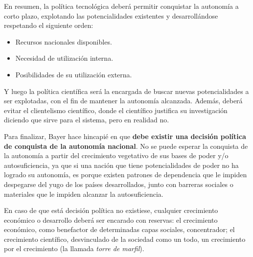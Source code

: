 En resumen, la política tecnológica deberá permitir conquistar la autonomía a corto
plazo, explotando las potencialidades existentes y desarrollándose respetando el siguiente orden:
\begin{itemize}
    \item Recursos nacionales disponibles.
    \item Necesidad de utilización interna.
    \item Posibilidades de su utilización externa.
\end{itemize}

Y luego la política científica será la encargada de buscar nuevas potencialidades a ser explotadas, con el fin de mantener la autonomía alcanzada. Además, deberá evitar el clientelismo científico, donde el científico justifica su investigación diciendo que sirve para el sistema, pero en realidad no.

\vspace{0.5em}

Para finalizar, Bayer hace hincapié en que \textbf{debe existir una decisión política de conquista de la autonomía nacional}. No se puede esperar la conquista de la autonomía a partir del crecimiento vegetativo de sus bases de poder y/o autosuficiencia, ya que si una nación que tiene potencialidades de poder no ha logrado su autonomía, es porque existen patrones de dependencia que le impiden despegarse del yugo de los países desarrollados, junto con barreras sociales o materiales que le impiden alcanzar la autosuficiencia.

En caso de que está decisión política no existiese, cualquier crecimiento económico o desarrollo deberá ser encarado con reservas: el crecimiento económico, como benefactor de determinadas capas sociales, concentrador; el crecimiento científico, desvinculado de la sociedad como un todo, un crecimiento por el crecimiento (la llamada \textit{torre de marfil}).
